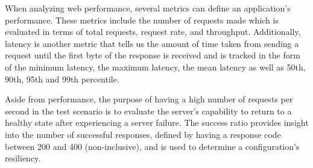 When analyzing web performance, several metrics can define an application's performance. These metrics include the number of requests made which is evaluated in terms of total requests, request rate, and throughput. Additionally, latency is another metric that tells us the amount of time taken from sending a request until the first byte of the response is received and is tracked in the form of the minimum latency, the maximum latency, the mean latency as well as 50th, 90th, 95th and 99th percentile. 

Aside from performance, the purpose of having a high number of requests per second in the test scenario is to evaluate the server's capability to return to a healthy state after experiencing a server failure. The success ratio provides insight into the number of successful responses, defined by having a response code between 200 and 400 (non-inclusive), and is used to determine a configuration's resiliency.

